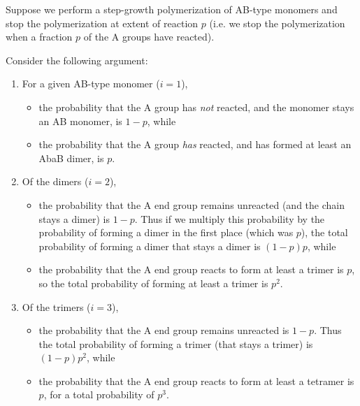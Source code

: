 \begin{activity}
\begin{instructornotes}
\end{instructornotes}


\begin{model}

Suppose we perform a step-growth polymerization of AB-type monomers and stop the polymerization at extent of reaction $p$ (i.e. we stop the polymerization when a fraction $p$ of the A groups have reacted).

Consider the following argument:

\begin{enumerate}
\item For a given AB-type monomer ($i=1$), 
\begin{itemize}
	\item the probability that the A group has \textit{not} reacted, and the monomer stays an AB monomer, is $1-p$, while

	\item the probability that the A group \textit{has} reacted, and has formed at least an AbaB dimer, is $p$.
\end{itemize}

\item Of the dimers ($i=2$),
\begin{itemize}
	\item the probability that the A end group remains unreacted (and the chain stays a dimer) is $1-p$.  Thus if we multiply this probability by the probability of forming a dimer in the first place (which was $p$), the total probability of forming a dimer that stays a dimer is $(1-p)p$, while

	\item the probability that the A end group reacts to form at least a trimer is $p$, so the total probability of forming at least a trimer is $p^2$.
\end{itemize}

\item Of the trimers ($i=3$),
\begin{itemize}
	\item the probability that the A end group remains unreacted is $1-p$.  Thus the total probability of forming a trimer (that stays a trimer) is $(1-p)p^2$, while
	\item the probability that the A end group reacts to form at least a tetramer is $p$, for a total probability of $p^3$.
\end{itemize}
\end{enumerate}


\end{model}
\end{activity}
